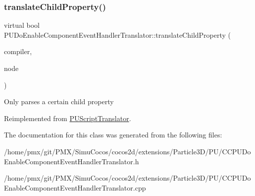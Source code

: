 \subsubsection{\texorpdfstring{translate\+Child\+Property()}{translateChildProperty()}\hspace{0.1cm}{\footnotesize\ttfamily [2/2]}}
{\footnotesize\ttfamily virtual bool P\+U\+Do\+Enable\+Component\+Event\+Handler\+Translator\+::translate\+Child\+Property (\begin{DoxyParamCaption}\item[{\hyperlink{classPUScriptCompiler}{P\+U\+Script\+Compiler} $\ast$}]{compiler,  }\item[{\hyperlink{classPUAbstractNode}{P\+U\+Abstract\+Node} $\ast$}]{node }\end{DoxyParamCaption})\hspace{0.3cm}{\ttfamily [virtual]}}

Only parses a certain child property 

Reimplemented from \hyperlink{classPUScriptTranslator_a0374d83a8a04e57918975d525e0f8fe8}{P\+U\+Script\+Translator}.



The documentation for this class was generated from the following files\+:\begin{DoxyCompactItemize}
\item 
/home/pmx/git/\+P\+M\+X/\+Simu\+Cocos/cocos2d/extensions/\+Particle3\+D/\+P\+U/C\+C\+P\+U\+Do\+Enable\+Component\+Event\+Handler\+Translator.\+h\item 
/home/pmx/git/\+P\+M\+X/\+Simu\+Cocos/cocos2d/extensions/\+Particle3\+D/\+P\+U/C\+C\+P\+U\+Do\+Enable\+Component\+Event\+Handler\+Translator.\+cpp\end{DoxyCompactItemize}
